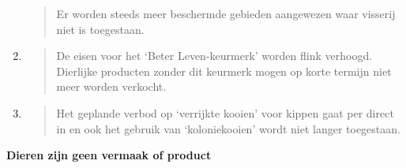 \begin{enumerate}
  \begin{quote}
  Er worden steeds meer beschermde gebieden aangewezen waar visserij
  niet is toegestaan.
  \end{quote}
\item
  \begin{quote}
  De eisen voor het `Beter Leven-keurmerk' worden flink verhoogd.
  Dierlijke producten zonder dit keurmerk mogen op korte termijn niet
  meer worden verkocht.
  \end{quote}
\item
  \begin{quote}
  Het geplande verbod op `verrijkte kooien' voor kippen gaat per direct
  in en ook het gebruik van `koloniekooien' wordt niet langer
  toegestaan.
  \end{quote}
\end{enumerate}

\textbf{Dieren zijn geen vermaak of product}

